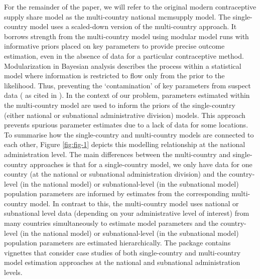 For the remainder of the paper, we will refer to the original modern contraceptive supply share model as the multi-country national mcmsupply model. The single-country  model uses a scaled-down version of the multi-country approach. It borrows strength from the multi-country model using modular model runs with informative priors placed on key parameters to provide precise outcome estimation, even in the absence of data for a particular contraceptive method. Modularization in Bayesian analysis describes the process within a statistical model where information is restricted to flow only from the prior to the likelihood. Thus, preventing the `contamination' of key parameters from suspect data (\citet{Lunn2009} as cited in \citet{Plummer2015}). In the context of our problem, parameters estimated within the multi-country model are used to inform the priors of the single-country (either national or subnational administrative division) models. This approach prevents spurious parameter estimates due to a lack of data for some locations. To summarise how the single-country and multi-country models are connected to each other, Figure \ref{fig:fig-1} depicts this modelling relationship at the national administration level. The main differences between the multi-country and single-country approaches is that for a single-country model, we only have data for one country (at the national or subnational administration division) and the country-level (in the national model) or subnational-level (in the subnational model) population parameters are informed by estimates from the corresponding multi-country model. In contrast to this, the multi-country model uses national or subnational level data (depending on your administrative level of interest) from many countries simultaneously to estimate model parameters and the country-level (in the national model) or subnational-level (in the subnational model) population parameters are estimated hierarchically. The  package contains vignettes that consider case studies of both single-country and multi-country model estimation approaches at the national and subnational administration levels.

